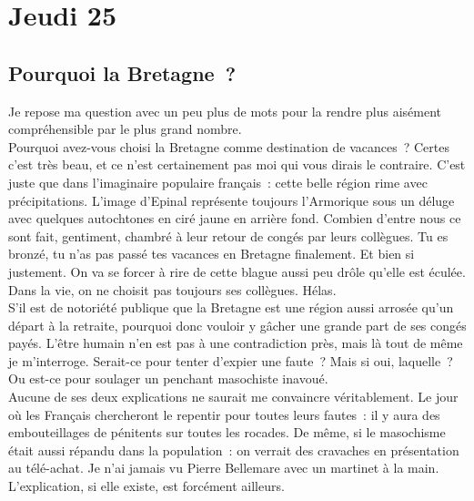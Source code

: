 ﻿\section*{Jeudi 25}
\subsection*{Pourquoi la Bretagne ?}
Je repose ma question avec un peu plus de mots pour la rendre plus aisément compréhensible par le plus grand nombre. \\
Pourquoi avez-vous choisi la Bretagne comme destination de vacances ? Certes c’est très beau, et ce n’est certainement pas moi qui vous dirais le contraire. C’est juste que dans l’imaginaire populaire français : cette belle région rime avec précipitations. L’image d’Epinal représente toujours l’Armorique sous un déluge avec quelques autochtones en ciré jaune en arrière fond. Combien d’entre nous ce sont fait, gentiment, chambré à leur retour de congés par leurs collègues. Tu es bronzé, tu n’as pas passé tes vacances en Bretagne finalement. Et bien si justement. On va se forcer à rire de cette blague aussi peu drôle qu’elle est éculée. Dans la vie, on ne choisit pas toujours ses collègues. Hélas. \\

S’il est de notoriété publique que la Bretagne est une région aussi arrosée qu’un départ à la retraite, pourquoi donc vouloir y gâcher une grande part de ses congés payés. L’être humain n’en est pas à une contradiction près, mais là tout de même je m’interroge. Serait-ce pour tenter d’expier une faute ? Mais si oui, laquelle ? Ou est-ce pour soulager un penchant masochiste inavoué. \\
Aucune de ses deux explications ne saurait me convaincre véritablement. Le jour où les Français chercheront le repentir pour toutes leurs fautes : il y aura des embouteillages de pénitents sur toutes les rocades. De même, si le masochisme était aussi répandu dans la population : on verrait des cravaches en présentation au télé-achat. Je n’ai jamais vu Pierre Bellemare avec un martinet à la main. \\

L’explication, si elle existe, est forcément ailleurs. \\

